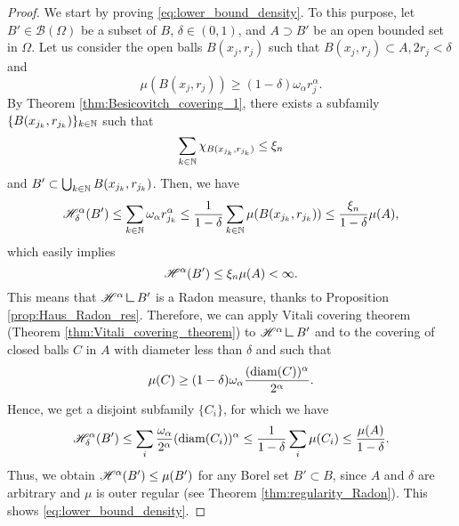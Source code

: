 \begin{proof}
We start by proving \eqref{eq:lower_bound_density}. To this purpose, let $B' \in \mathcal{B}(\Omega)$ be a subset of $B$, $\delta \in (0, 1)$, and $A \supset B'$ be an open bounded set in $\Omega$. Let us consider the open balls $B(x_{j}, r_{j})$ such that $B(x_{j}, r_{j}) \subset A, 2 r_{j} < \delta$ and $$\mu(B(x_{j}, r_{j})) \ge (1 - \delta) \omega_{\alpha} r_{j}^{\alpha}.$$
By Theorem \ref{thm:Besicovitch_covering_1}, there exists a subfamily $\{B(x_{j_{k}}, r_{j_{k}})\}_{k \in \mathbb{N}}$ such that
\begin{equation*}
\sum_{k \in \mathbb{N}} \chi_{B(x_{j_{k}}, r_{j_{k}})} \le \xi_{n}
\end{equation*}
and $B' \subset \bigcup_{k \in \mathbb{N}} B(x_{j_{k}}, r_{j_{k}})$. Then, we have
\begin{equation*}
\mathscr{H}^{\alpha}_{\delta}(B') \le \sum_{k \in \mathbb{N}} \omega_{\alpha} r_{j_{k}}^{\alpha} \le \frac{1}{1 - \delta} \sum_{k \in \mathbb{N}} \mu(B(x_{j_{k}}, r_{j_{k}})) \le \frac{\xi_{n}}{1 - \delta} \mu(A),
\end{equation*}
which easily implies
\begin{equation*}
\mathscr{H}^{\alpha}(B') \le \xi_{n} \mu(A) < \infty.
\end{equation*}
This means that $\Haus{\alpha} \res B'$ is a Radon measure, thanks to Proposition \ref{prop:Haus_Radon_res}. Therefore, we can apply Vitali covering theorem (Theorem \ref{thm:Vitali_covering_theorem}) to $\Haus{\alpha} \res B'$ and to the covering of closed balls $C$ in $A$ with diameter less than $\delta$ and such that
\begin{equation*}
\mu(C) \ge (1 - \delta) \omega_{\alpha} \frac{({\rm diam} (C))^{\alpha}}{2^{\alpha}}.
\end{equation*}
Hence, we get a disjoint subfamily $\{C_{i}\}$, for which we have
\begin{equation*}
\mathscr{H}^{\alpha}_{\delta}(B') \le \sum_{i} \frac{\omega_{\alpha}}{2^{\alpha}} ({\rm diam} (C_{i}))^{\alpha} \le \frac{1}{1 - \delta} \sum_{i} \mu(C_{i}) \le \frac{\mu(A)}{1 - \delta}.
\end{equation*}
Thus, we obtain $\mathscr{H}^{\alpha}(B') \le \mu(B')$ for any Borel set $B' \subset B$, since $A$ and $\delta$ are arbitrary and $\mu$ is outer regular (see Theorem \ref{thm:regularity_Radon}). This shows \eqref{eq:lower_bound_density}.


\end{proof}
